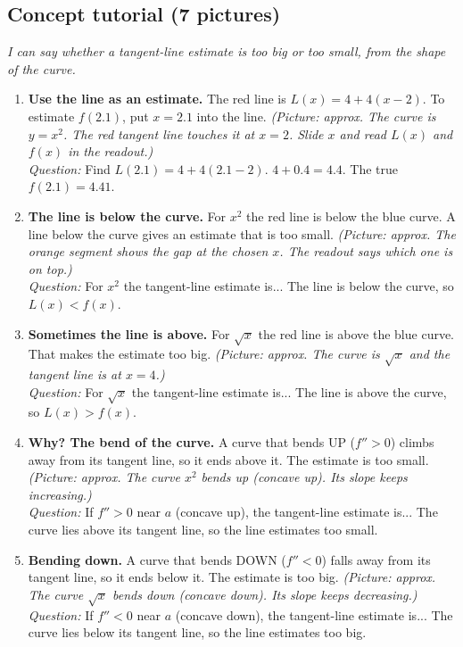 \documentclass[11pt]{article}
\begin{document}
\subsection*{Concept tutorial (7 pictures)}
\textit{I can say whether a tangent-line estimate is too big or too small, from the shape of the curve.}\par
\begin{enumerate}
\item \textbf{Use the line as an estimate.} The red line is $L(x)=4+4(x-2)$. To estimate $f(2.1)$, put $x=2.1$ into the line. \textit{(Picture: approx. The curve is $y=x^2$. The red tangent line touches it at $x=2$. Slide $x$ and read $L(x)$ and $f(x)$ in the readout.)}\\ \textit{Question:} Find $L(2.1)=4+4(2.1-2)$.  $4+0.4=4.4$. The true $f(2.1)=4.41$.
\item \textbf{The line is below the curve.} For $x^2$ the red line is below the blue curve. A line below the curve gives an estimate that is too small. \textit{(Picture: approx. The orange segment shows the gap at the chosen $x$. The readout says which one is on top.)}\\ \textit{Question:} For $x^2$ the tangent-line estimate is...  The line is below the curve, so $L(x)<f(x)$.
\item \textbf{Sometimes the line is above.} For $\sqrt{x}$ the red line is above the blue curve. That makes the estimate too big. \textit{(Picture: approx. The curve is $\sqrt{x}$ and the tangent line is at $x=4$.)}\\ \textit{Question:} For $\sqrt{x}$ the tangent-line estimate is...  The line is above the curve, so $L(x)>f(x)$.
\item \textbf{Why? The bend of the curve.} A curve that bends UP ($f''>0$) climbs away from its tangent line, so it ends above it. The estimate is too small. \textit{(Picture: approx. The curve $x^2$ bends up (concave up). Its slope keeps increasing.)}\\ \textit{Question:} If $f''>0$ near $a$ (concave up), the tangent-line estimate is...  The curve lies above its tangent line, so the line estimates too small.
\item \textbf{Bending down.} A curve that bends DOWN ($f''<0$) falls away from its tangent line, so it ends below it. The estimate is too big. \textit{(Picture: approx. The curve $\sqrt{x}$ bends down (concave down). Its slope keeps decreasing.)}\\ \textit{Question:} If $f''<0$ near $a$ (concave down), the tangent-line estimate is...  The curve lies below its tangent line, so the line estimates too big.

\end{enumerate}
\end{document}
